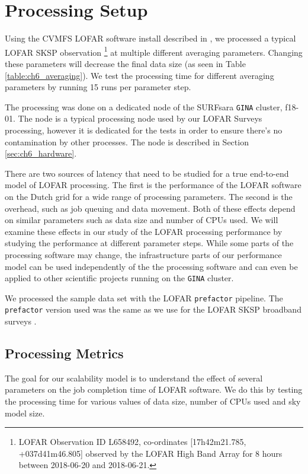 \section{Processing Setup }\label{sec:ch6_methods}
Using the CVMFS LOFAR software install described in \citep{mechev17}, we processed a typical LOFAR SKSP observation \footnote{LOFAR Observation ID L658492, co-ordinates [17h42m21.785, +037d41m46.805] observed by the LOFAR High Band Array for 8 hours between 2018-06-20 and 2018-06-21. } at multiple different averaging parameters. Changing these parameters will decrease the final data size (as seen in Table \ref{table:ch6_averaging}). We test the processing time for different averaging parameters by running 15 runs per parameter step. 

The processing was done on a dedicated node of the SURFsara \texttt{GINA} cluster, f18-01. The node is a typical processing node used by our LOFAR Surveys processing, however it is dedicated for the tests in order to ensure there's no contamination by other processes. The node is described in Section \ref{sec:ch6_hardware}. 
     
There are two sources of latency that need to be studied for a true end-to-end model of LOFAR processing. The first is the performance of the LOFAR software on the Dutch grid for a wide range of processing parameters. The second is the overhead, such as job queuing and data movement. Both of these effects depend on similar parameters such as data size and number of CPUs used. We will examine these effects in our study of the LOFAR processing performance by studying the performance at different parameter steps. While some parts of the processing software may change, the infrastructure parts of our performance model can be used independently of the the processing software and can even be applied to other scientific projects running on the \texttt{GINA} cluster. 

We processed the sample data set with the LOFAR \texttt{prefactor} pipeline. The \texttt{prefactor} version used was the same as we use for the LOFAR SKSP broadband surveys \citep{prefactor_zenodo}. 

\subsection{Processing Metrics}
The goal for our scalability model is to understand the effect of several parameters on the job completion time of LOFAR software. We do this by testing the processing time for various values of data size, number of CPUs used and sky model size. 

